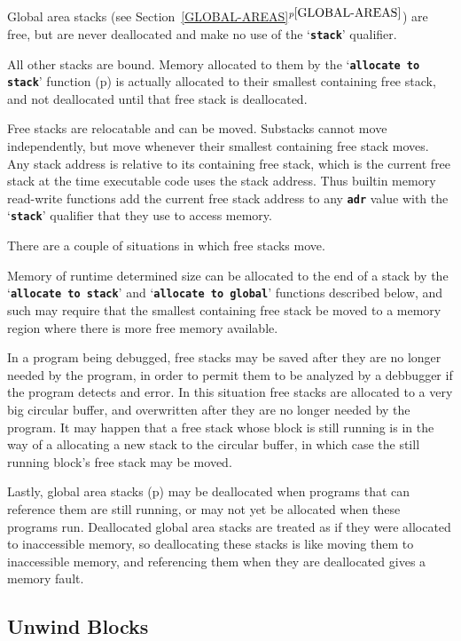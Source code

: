 \documentclass[12pt]{article}
\newcommand{\TT}[1]{{\tt \bfseries #1}}
\newcommand{\itemref}[1]{\ref{#1}$^{p\pageref{#1}}$}
\newcommand{\pagref}[1]{p\pageref{#1}}
\begin{document}
Global area stacks (see Section~\itemref{GLOBAL-AREAS}) are free,
but are never deallocated and make no use of the `\TT{stack}'
qualifier.

All other stacks are bound.  Memory allocated to them
by the `\TT{allocate to stack}' function (\pagref{ALLOCATE-TO-STACK})
is actually
allocated to their smallest containing free stack, and not deallocated
until that free stack is deallocated.

Free stacks are relocatable and can be moved.
Substacks cannot move independently,
but move whenever their smallest containing free stack moves.
Any stack address is relative to its containing free stack,
which is the current free stack at the time executable code uses
the stack address.  Thus builtin memory read-write functions add the
current free stack address to any \TT{adr} value with the
`\TT{stack}' qualifier that they use to access memory.

There are a couple of situations in which free stacks move.

Memory of runtime determined size can be allocated to the end of
a stack by the `\TT{allocate to stack}' and `\TT{allocate to global}'
functions described below, and such may
require that the smallest containing free stack
be moved to a memory region where there is more free memory available.

In a program being debugged, free stacks may be saved after they are no
longer needed by the program, in order to permit them to be analyzed
by a debbugger if the program detects and error.  In this situation
free stacks are allocated to a very big circular buffer, and overwritten
after they are no longer needed by the program.  It may happen that
a free stack whose block is still running is in the way of a allocating
a new stack to the circular buffer, in which case the still running
block's free stack may be moved.

Lastly, global area stacks (\pagref{GLOBAL-AREAS})
may be deallocated when programs that
can reference them are still running, or may not yet be allocated
when these programs run.  Deallocated global area stacks are treated as if
they were allocated to inaccessible memory, so deallocating these stacks
is like moving them to inaccessible memory, and referencing
them when they are deallocated gives a memory fault.


\subsection{Unwind Blocks}
\label{UNWIND-BLOCKS}
\end{document}
